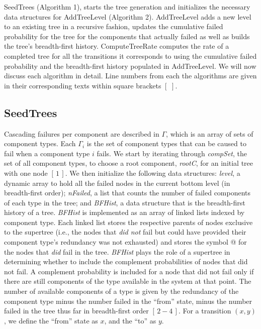 \documentclass[12pt]{article}
\newcommand{\citeLine}[1]{$[\,#1\,]$}
\newcommand{\citeBlock}[2]{$[\,#1 - #2\,]$}
\begin{document}
SeedTrees (Algorithm 1), starts the tree generation and initializes the necessary data structures for AddTreeLevel (Algorithm 2). AddTreeLevel adds a new level to an existing tree in a recursive fashion, updates the cumulative failed probability for the tree for the components that actually failed as well as builds the tree's breadth-first history. ComputeTreeRate computes the rate of a completed tree for all the transitions it corresponds to using the cumulative failed probability and the breadth-first history populated in AddTreeLevel. We will now discuss each algorithm in detail. Line numbers from each the algorithms are given in their corresponding texts within square brackets \citeLine{}.

\subsection{SeedTrees}

Cascading failures per component are described in $\Gamma$, which is an array of sets of component types. Each $\Gamma_i$ is the set of component types that can be caused to fail when a component type $i$ fails. We start by iterating through \textit{compSet}, the set of all component types, to choose a root component, \textit{rootC}, for an initial tree with one node \citeLine{1}. We then initialize the following data structures: \textit{level}, a dynamic array to hold all the failed nodes in the current bottom level (in breadth-first order); \textit{nFailed}, a list that counts the number of failed components of each type in the tree; and \textit{BFHist}, a data structure that is the breadth-first history of a tree. \textit{BFHist} is implemented as an array of linked lists indexed by component type. Each linked list stores the respective parents of nodes exclusive to the supertree (i.e., the nodes that \textit{did not} fail but could have provided their component type's redundancy was not exhausted) and stores the symbol @ for the nodes that \textit{did} fail in the tree. \textit{BFHist} plays the role of a supertree in determining whether to include the complement probabilities of nodes that did not fail. A complement probability is included for a node that did not fail only if there are still components of the type available in the system at that point. The number of available components of a type is given by the redundancy of the component type minus the number failed in the ``from'' state, minus the number failed in the tree thus far in breadth-first order \citeBlock{2}{4}. For a transition $(x,y)$, we define the ``from'' state as $x$, and the ``to'' as $y$.
\end{document}
